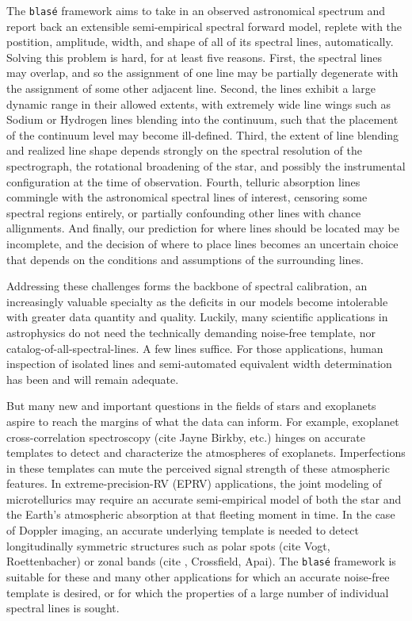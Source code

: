 \documentclass[modern]{aastex631}
\begin{document}
The \texttt{blas\'e} framework aims to take in an observed astronomical spectrum and report back an extensible semi-empirical spectral forward model, replete with the postition, amplitude, width, and shape of all of its spectral lines, automatically.  Solving this problem is hard, for at least five reasons.  First, the spectral lines may overlap, and so the assignment of one line may be partially degenerate with the assignment of some other adjacent line.  Second, the lines exhibit a large dynamic range in their allowed extents, with extremely wide line wings such as Sodium or Hydrogen lines blending into the continuum, such that the placement of the continuum level may become ill-defined.  Third, the extent of line blending and realized line shape depends strongly on the spectral resolution of the spectrograph, the rotational broadening of the star, and possibly the instrumental configuration at the time of observation.  Fourth, telluric absorption lines commingle with the astronomical spectral lines of interest, censoring some spectral regions entirely, or partially confounding other lines with chance allignments.  And finally, our prediction for where lines should be located may be incomplete, and the decision of where to place lines becomes an uncertain choice that depends on the conditions and assumptions of the surrounding lines.

Addressing these challenges forms the backbone of spectral calibration, an increasingly valuable specialty as the deficits in our models become intolerable with greater data quantity and quality.  Luckily, many scientific applications in astrophysics do not need the technically demanding noise-free template, nor catalog-of-all-spectral-lines.  A few lines suffice.  For those applications, human inspection of isolated lines and semi-automated equivalent width determination has been and will remain adequate.  

But many new and important questions in the fields of stars and exoplanets aspire to reach the margins of what the data can inform.  For example, exoplanet cross-correlation spectroscopy (cite  Jayne Birkby, etc.) hinges on accurate templates to detect and characterize the atmospheres of exoplanets.  Imperfections in these templates can mute the perceived signal strength of these atmospheric features.  In extreme-precision-RV (EPRV) applications, the joint modeling of microtellurics may require an accurate semi-empirical model of both the star and the Earth's atmospheric absorption at that fleeting moment in time.  In the case of Doppler imaging, an accurate underlying template is needed to detect longitudinally symmetric structures such as polar spots (cite  Vogt, Roettenbacher) or zonal bands (cite , Crossfield, Apai).  The \texttt{blas\'e} framework is suitable for these and many other applications for which an accurate noise-free template is desired, or for which the properties of a large number of individual spectral lines is sought.
\end{document}
